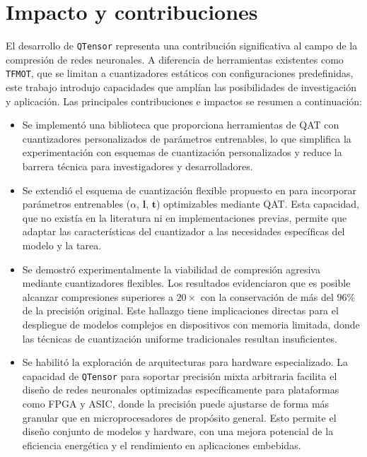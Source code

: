 \section{Impacto y contribuciones}

El desarrollo de \texttt{QTensor} representa una contribución significativa al campo de la compresión de redes neuronales. A diferencia de herramientas existentes como \texttt{TFMOT}, que se limitan a cuantizadores estáticos con configuraciones predefinidas, este trabajo introdujo capacidades que amplían las posibilidades de investigación y aplicación. Las principales contribuciones e impactos se resumen a continuación:

\begin{itemize}
    \item Se implementó una biblioteca que proporciona herramientas de QAT con cuantizadores personalizados de parámetros entrenables, lo que simplifica la experimentación con esquemas de cuantización personalizados y reduce la barrera técnica para investigadores y desarrolladores.

    \item Se extendió el esquema de cuantización flexible propuesto en \cite{electronics13101923} para incorporar parámetros entrenables ($\alpha$, $\mathbf{l}$, $\mathbf{t}$) optimizables mediante QAT. Esta capacidad, que no existía en la literatura ni en implementaciones previas, permite que adaptar las características del cuantizador a las necesidades específicas del modelo y la tarea.

    \item Se demostró experimentalmente la viabilidad de compresión agresiva mediante cuantizadores flexibles. Los resultados evidenciaron que es posible alcanzar compresiones superiores a $20\times$ con la conservación de más del $96\%$ de la precisión original. Este hallazgo tiene implicaciones directas para el despliegue de modelos complejos en dispositivos con memoria limitada, donde las técnicas de cuantización uniforme tradicionales resultan insuficientes.

    \item Se habilitó la exploración de arquitecturas para hardware especializado. La capacidad de \texttt{QTensor} para soportar precisión mixta arbitraria facilita el diseño de redes neuronales optimizadas específicamente para plataformas como FPGA y ASIC, donde la precisión puede ajustarse de forma más granular que en microprocesadores de propósito general. Esto permite el diseño conjunto de modelos y hardware, con una mejora potencial de la eficiencia energética y el rendimiento en aplicaciones embebidas.
\end{itemize}

